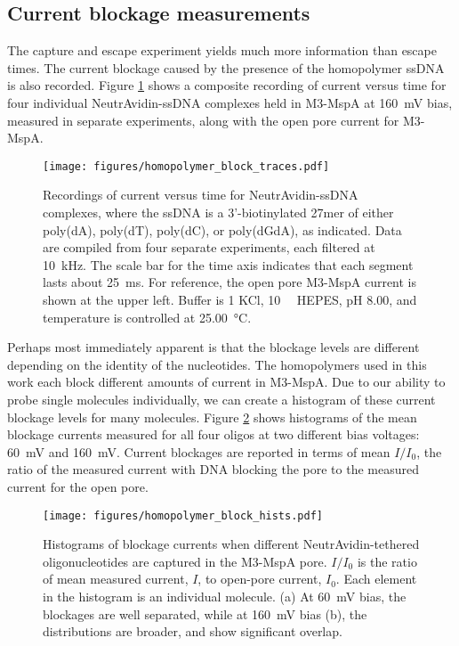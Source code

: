\subsection{Current blockage measurements}

The capture and escape experiment yields much more information than escape times.  The current blockage caused by the presence of the homopolymer ssDNA is also recorded.  Figure \ref{fig:homopolymer_blockages} shows a composite recording of current versus time for four individual NeutrAvidin-ssDNA complexes held in M3-MspA at \SI{160}{\mV} bias, measured in separate experiments, along with the open pore current for M3-MspA.

\begin{figure}[h]
\begin{centering}
\texttt{[image: figures/homopolymer\_block\_traces.pdf]}
\caption[Current blockage traces for homopolymer ssDNA]{Recordings of current versus time for NeutrAvidin-ssDNA complexes, where the ssDNA is a 3'-biotinylated 27mer of either poly(dA), poly(dT), poly(dC), or poly(dGdA), as indicated.  Data are compiled from four separate experiments, each filtered at \SI{10}{\kHz}.  The scale bar for the time axis indicates that each segment lasts about \SI{25}{\ms}.  For reference, the open pore M3-MspA current is shown at the upper left.  Buffer is \SI{1}{\Molar} KCl, \SI{10}{\milli\Molar} HEPES, pH \num{8.00}, and temperature is controlled at \SI{25.00}{\celsius}.}
\label{fig:homopolymer_blockages}
\end{centering}
\end{figure}

Perhaps most immediately apparent is that the blockage levels are different depending on the identity of the nucleotides.  The homopolymers used in this work each block different amounts of current in M3-MspA.  Due to our ability to probe single molecules individually, we can create a histogram of these current blockage levels for many molecules.  Figure \ref{fig:homopolymer_blockage_hists} shows histograms of the mean blockage currents measured for all four oligos at two different bias voltages: \SI{60}{\mV} and \SI{160}{\mV}.  Current blockages are reported in terms of mean $I/I_0$, the ratio of the measured current with DNA blocking the pore to the measured current for the open pore.

\begin{figure}[h]
\begin{centering}
\texttt{[image: figures/homopolymer\_block\_hists.pdf]}
\caption[Current blockage histograms for homopolymer ssDNA]{Histograms of blockage currents when different NeutrAvidin-tethered oligonucleotides are captured in the M3-MspA pore.  $I/I_0$ is the ratio of mean measured current, $I$, to open-pore current, $I_0$.  Each element in the histogram is an individual molecule.  (a) At \SI{60}{\mV} bias, the blockages are well separated, while at \SI{160}{\mV} bias (b), the distributions are broader, and show significant overlap.}
\label{fig:homopolymer_blockage_hists}
\end{centering}
\end{figure}

